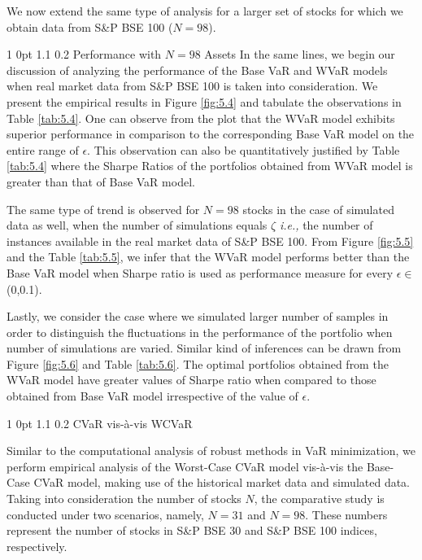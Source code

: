 \documentclass[12pt]{article}
\makeatletter
\numberwithin{equation}{section}
\renewcommand{\subsection}{
  \@startsection
  {subsection}%
  {1}%
  {0pt}%
  {1.1\baselineskip}%
  {0.2\baselineskip}%
  {\sc \centering}%
}
\renewcommand{\subsubsection}{
  \@startsection
  {subsubsection}%
  {1}%
  {0pt}%
  {1.1\baselineskip}%
  {0.2\baselineskip}%
  {\sc \centering}%
}
\makeatother
\begin{document}
We now extend the same type of analysis for a larger set of stocks for which we obtain data from S\&P BSE 100 ($N = 98$).

\subsubsection{Performance with $N=98$ Assets}
In the same lines, we begin our discussion of analyzing the performance of the Base VaR and WVaR models when real market data from S\&P BSE 100 is taken into consideration. We present the empirical results in Figure \ref{fig:5.4} and tabulate the observations in Table \ref{tab:5.4}. One can observe from the plot that the WVaR model exhibits superior performance in comparison to the corresponding Base VaR model on the entire range of $\epsilon$. This observation can also be quantitatively justified by Table \ref{tab:5.4} where the Sharpe Ratios of the portfolios obtained from WVaR model is greater than that of Base VaR model.

The same type of trend is observed for $N=98$ stocks in the case of simulated data as well, when the number of simulations equals $\zeta$ \textit{i.e.,} the number of instances available in the real market data of S\&P BSE 100. From Figure \ref{fig:5.5} and the Table \ref{tab:5.5}, we infer that the WVaR model performs better than the Base VaR model when Sharpe ratio is used as performance measure for every $\epsilon \in$ (0,0.1).

Lastly, we consider the case where we simulated larger number of samples in order to distinguish the fluctuations in the performance of the portfolio when number of simulations are varied. Similar kind of inferences can be drawn from Figure \ref{fig:5.6} and Table \ref{tab:5.6}. The optimal portfolios obtained from the WVaR model have greater values of Sharpe ratio when compared to those obtained from Base VaR model irrespective of the value of $\epsilon$.

\subsection{CVaR vis-\`a-vis WCVaR}

Similar to the computational analysis of robust methods in VaR minimization, we perform empirical analysis of the Worst-Case CVaR  model vis-\`a-vis the Base-Case CVaR model, making use of the historical market data and simulated data. Taking into consideration the number of stocks $N$, the comparative study is conducted under two scenarios, namely, $N=31$ and $N=98$. These numbers represent the number of stocks in S\&P BSE 30 and S\&P BSE 100 indices, respectively.
\end{document}
